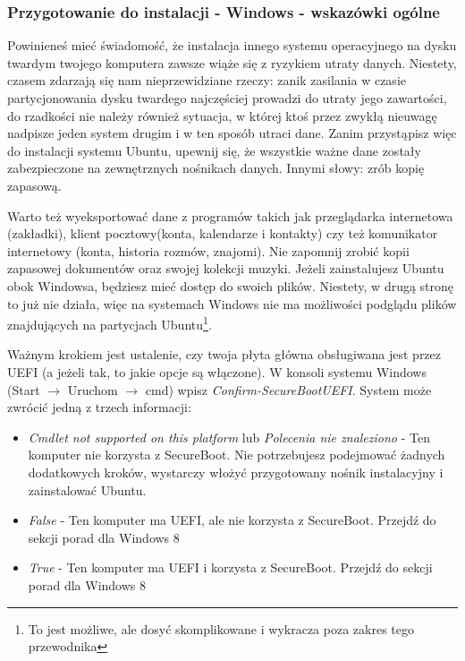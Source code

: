 \subsubsection{Przygotowanie do instalacji - Windows - wskazówki ogólne}
\label{sec:przygotowanie_windows}
Powinieneś mieć świadomość, że instalacja innego systemu operacyjnego na dysku twardym twojego komputera zawsze wiąże się z ryzykiem utraty danych. Niestety, czasem zdarzają się nam nieprzewidziane rzeczy: zanik zasilania w czasie partycjonowania dysku twardego najczęściej prowadzi do utraty jego zawartości, do rzadkości nie należy również sytuacja, w której ktoś przez zwykłą nieuwagę  nadpisze jeden system drugim i w ten sposób utraci dane. Zanim przystąpisz więc do instalacji systemu Ubuntu, upewnij się, że wszystkie ważne dane zostały zabezpieczone na zewnętrznych nośnikach danych. Innymi słowy: zrób kopię zapasową.

Warto też wyeksportować dane z programów takich jak przeglądarka internetowa (zakładki), klient pocztowy(konta, kalendarze i kontakty) czy też komunikator internetowy (konta, historia rozmów, znajomi). Nie zapomnij zrobić kopii zapasowej dokumentów oraz swojej kolekcji muzyki. Jeżeli zainstalujesz Ubuntu obok Windowsa, będziesz mieć dostęp do swoich plików. Niestety, w drugą stronę to już nie działa, więc na systemach Windows nie ma możliwości podglądu plików znajdujących na partycjach Ubuntu\footnote{To jest możliwe, ale dosyć skomplikowane i wykracza poza zakres tego przewodnika}.

Ważnym krokiem jest ustalenie, czy twoja płyta główna obsługiwana jest przez UEFI (a jeżeli tak, to jakie opcje są włączone). W konsoli systemu Windows (Start $\rightarrow$ Uruchom $\rightarrow$ cmd) wpisz \textit{Confirm-SecureBootUEFI}. System może zwrócić jedną z trzech informacji:
\begin{itemize}
\item \textit{Cmdlet not supported on this platform} lub \textit{Polecenia nie znaleziono} - Ten komputer nie korzysta z SecureBoot. Nie potrzebujesz podejmować żadnych dodatkowych kroków, wystarczy włożyć przygotowany nośnik instalacyjny i zainstalować Ubuntu.
\item \textit{False} - Ten komputer ma UEFI, ale nie korzysta z SecureBoot. Przejdź do sekcji porad dla Windows 8
\item \textit{True} - Ten komputer ma UEFI i korzysta z SecureBoot. Przejdź do sekcji porad dla Windows 8
\end{itemize}
